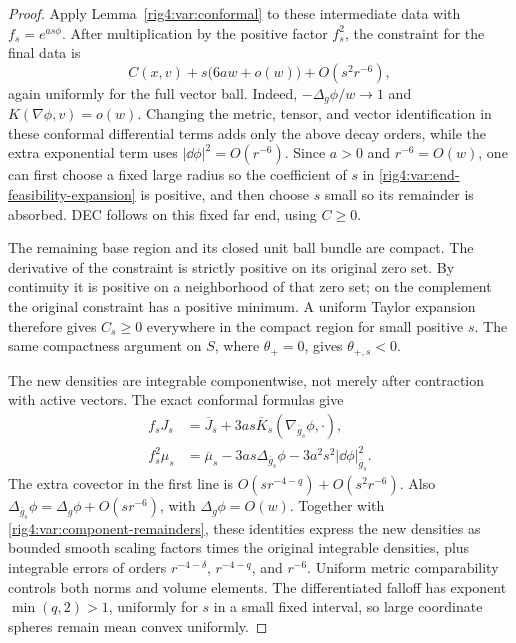 \begin{proof}
Apply Lemma~\ref{rig4:var:conformal} to these intermediate data with
$f_s=e^{as\phi}$. After multiplication by the positive factor $f_s^2$, the
constraint for the final data is
\begin{equation}
 C(x,v)+s\bigl(6aw+o(w)\bigr)+O(s^2r^{-6}),
\label{rig4:var:end-feasibility-expansion}
\end{equation}
again uniformly for the full vector ball. Indeed,
$-\Delta_g\phi/w\to1$ and $K(\nabla\phi,v)=o(w)$. Changing the metric,
tensor, and vector identification in these conformal differential terms
adds only the above decay orders, while the extra exponential term uses
$|\dd\phi|^2=O(r^{-6})$. Since $a>0$ and
$r^{-6}=O(w)$, one can first choose a fixed large radius so the coefficient
of $s$ in \eqref{rig4:var:end-feasibility-expansion} is positive, and then
choose $s$ small so its remainder is absorbed. DEC follows on this fixed
far end, using $C\ge0$.

The remaining base region and its closed unit ball bundle are compact.
The derivative of the constraint is strictly positive on its original
zero set. By continuity it is positive on a neighborhood of that zero
set; on the complement the original constraint has a positive minimum.
A uniform Taylor expansion therefore gives $C_s\ge0$ everywhere in the
compact region for small positive $s$. The same compactness argument on
$S$, where $\theta_+=0$, gives $\theta_{+,s}<0$.

The new densities are integrable componentwise, not merely after
contraction with active vectors. The exact conformal formulas give
\begin{align*}
 f_sJ_s&=\overline J_s+
            3as\overline K_s(\nabla_{\overline g_s}\phi,\cdot),\\
 f_s^2\mu_s&=\overline\mu_s-3as\Delta_{\overline g_s}\phi
                          -3a^2s^2|\dd\phi|_{\overline g_s}^2.
\end{align*}
The extra covector in the first line is
$O(sr^{-4-q})+O(s^2r^{-6})$. Also
$\Delta_{\overline g_s}\phi=\Delta_g\phi+O(sr^{-6})$, with
$\Delta_g\phi=O(w)$. Together with
\eqref{rig4:var:component-remainders}, these identities express the new
densities as bounded smooth scaling factors times the original integrable
densities, plus integrable errors of orders $r^{-4-\delta}$,
$r^{-4-q}$, and $r^{-6}$. Uniform metric comparability controls both norms
and volume elements. The differentiated falloff has
exponent $\min(q,2)>1$, uniformly for $s$ in a small fixed interval, so
large coordinate spheres remain mean convex uniformly.


\end{proof}
